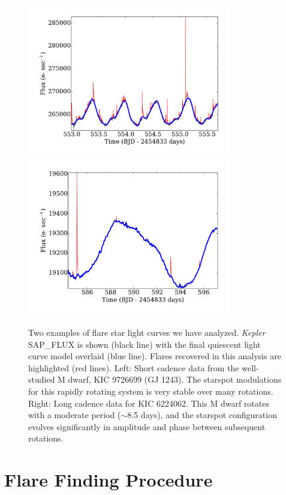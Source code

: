\documentclass[twocolumn]{aastex6}
\newcommand{\Kepler}{\textsl{Kepler}\xspace}
\begin{document}
\begin{figure}[!t]
\centering
\includegraphics[width=3.5in]{fig1a}
\includegraphics[width=3.5in]{fig1b}
\caption{
Two examples of flare star light curves we have analyzed. \Kepler SAP\_FLUX is shown (black line) with the final quiescent light curve model overlaid (blue line). Flares recovered in this analysis are highlighted (red lines). Left: Short cadence data from the well-studied M dwarf, KIC 9726699 (GJ 1243). The starspot modulations for this rapidly rotating system is very stable over many rotations. Right: Long cadence data for KIC 6224062. This M dwarf rotates with a moderate period ($\sim$8.5 days), and the starspot configuration evolves significantly in amplitude and phase between subsequent rotations.
}
\label{fig:lc}
\end{figure}


\section{Flare Finding Procedure}
\label{sec:find}
\end{document}
